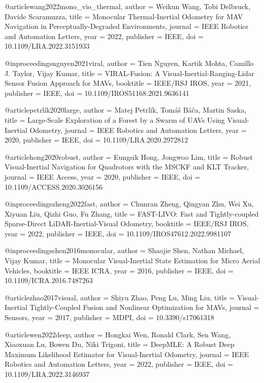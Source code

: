 @article{wang2022mono_vio_thermal,
  author = {Weikun Wang, Tobi Delbruck, Davide Scaramuzza},
  title = {Monocular Thermal-Inertial Odometry for MAV Navigation in Perceptually-Degraded Environments},
  journal = {IEEE Robotics and Automation Letters},
  year = {2022},
  publisher = {IEEE},
  doi = {10.1109/LRA.2022.3151933}
}

@inproceedings{nguyen2021viral,
  author = {Tien Nguyen, Kartik Mohta, Camillo J. Taylor, Vijay Kumar},
  title = {VIRAL-Fusion: A Visual-Inertial-Ranging-Lidar Sensor Fusion Approach for MAVs},
  booktitle = {IEEE/RSJ IROS},
  year = {2021},
  publisher = {IEEE},
  doi = {10.1109/IROS51168.2021.9636141}
}

@article{petrlík2020large,
  author = {Matej Petrlík, Tomáš Báča, Martin Saska},
  title = {Large-Scale Exploration of a Forest by a Swarm of UAVs Using Visual-Inertial Odometry},
  journal = {IEEE Robotics and Automation Letters},
  year = {2020},
  publisher = {IEEE},
  doi = {10.1109/LRA.2020.2972812}
}

@article{hong2020robust,
  author = {Eungsik Hong, Jongwoo Lim},
  title = {Robust Visual-Inertial Navigation for Quadrotors with the MSCKF and KLT Tracker},
  journal = {IEEE Access},
  year = {2020},
  publisher = {IEEE},
  doi = {10.1109/ACCESS.2020.3026156}
}

@inproceedings{zheng2022fast,
  author = {Chunran Zheng, Qingyan Zhu, Wei Xu, Xiyuan Liu, Qizhi Guo, Fu Zhang},
  title = {FAST-LIVO: Fast and Tightly-coupled Sparse-Direct LiDAR-Inertial-Visual Odometry},
  booktitle = {IEEE/RSJ IROS},
  year = {2022},
  publisher = {IEEE},
  doi = {10.1109/IROS47612.2022.9981107}
}

@inproceedings{shen2016monocular,
  author = {Shaojie Shen, Nathan Michael, Vijay Kumar},
  title = {Monocular Visual-Inertial State Estimation for Micro Aerial Vehicles},
  booktitle = {IEEE ICRA},
  year = {2016},
  publisher = {IEEE},
  doi = {10.1109/ICRA.2016.7487263}
}

@article{zhao2017visual,
  author = {Shiyu Zhao, Peng Lu, Ming Liu},
  title = {Visual-Inertial Tightly-Coupled Fusion and Nonlinear Optimization for MAVs},
  journal = {Sensors},
  year = {2017},
  publisher = {MDPI},
  doi = {10.3390/s17061318}
}

@article{wen2022deep,
  author = {Hongkai Wen, Ronald Clark, Sen Wang, Xiaoxuan Lu, Bowen Du, Niki Trigoni},
  title = {DeepMLE: A Robust Deep Maximum Likelihood Estimator for Visual-Inertial Odometry},
  journal = {IEEE Robotics and Automation Letters},
  year = {2022},
  publisher = {IEEE},
  doi = {10.1109/LRA.2022.3146937}
}

